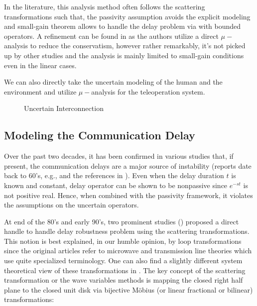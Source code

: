 In the literature, this analysis method often follows the scattering transformations such that, the passivity assumption avoids the
explicit modeling and small-gain theorem allows to handle the delay problem via with bounded operators. A refinement can be found 
 in \cite{poortenyokokohji} as the authors utilize a direct $\mu-$analysis to reduce the conservatism, however rather remarkably, it's not
picked up by other studies and the analysis is mainly limited to small-gain conditions even in the linear cases. 


We can also directly take the uncertain modeling of the human and the environment and utilize $\mu-$analysis for the teleoperation
system. 



\begin{figure}%
\centering%
\caption{Uncertain Interconnection}%
\label{fig:lit:uncincgeneral}%
\end{figure}



\subsection{Modeling the Communication Delay}

Over the past two decades, it has been confirmed in various studies that, if present, the communication delays are a major 
source of instability (reports date back to 60's, e.g., \cite{sheridanferrell} and the references in \cite{andersonspong}).
Even when the delay duration $t$ is known and constant, delay operator can be shown to be nonpassive since
$e^{-st}$ is not positive real. Hence, when combined with the passivity framework, it violates the assumptions on the uncertain
operators. 


At end of the 80's and early 90's, two prominent studies (\cite{andersonspong,nieslotine}) proposed a direct handle to handle delay 
robustness problem using the scattering transformations. This notion is best explained, in our humble opinion, by loop transformations 
since the original articles refer to microwave and transmission line theories which use quite specialized terminology. One can also
find a slightly different system theoretical view of these transformations in \cite{colgate3}. The key concept of the scattering transformation
or the wave variables methods is mapping the closed right half plane to the closed unit disk via bijective M\"{o}bius (or linear 
fractional or bilinear) transformations: 
 
